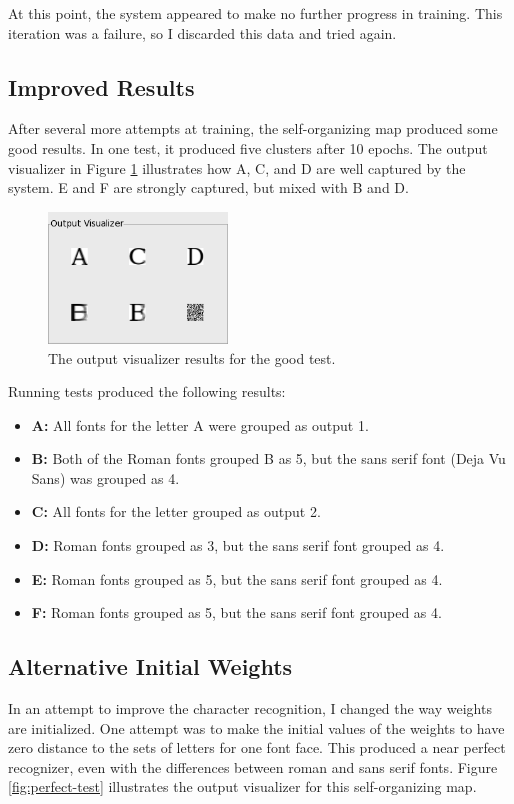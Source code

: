 \documentclass[12pt,letterpaper,oneside]{report}
\begin{document}
At this point, the system appeared to make no further progress in training. This iteration was a failure, so I discarded this data and tried again.

\subsection{Improved Results}
After several more attempts at training, the self-organizing map produced some good results. In one test, it produced five clusters after 10 epochs. The output visualizer in Figure \ref{fig:good-test} illustrates how A, C, and D are well captured by the system. E and F are strongly captured, but mixed with B and D.

\begin{figure}[ht]
  \centering
  \includegraphics[width=180px]{diagrams/good-test.png} 
  \caption{The output visualizer results for the good test.}
  \label{fig:good-test}
\end{figure}

Running tests produced the following results:
\begin{itemize}
    \item\textbf{{A:}} All fonts for the letter A were grouped as output 1.
    \item\textbf{{B:}} Both of the Roman fonts grouped B as 5, but the sans serif font (Deja Vu Sans) was grouped as 4.
    \item\textbf{{C:}} All fonts for the letter grouped as output 2.
    \item\textbf{{D:}} Roman fonts grouped as 3, but the sans serif font grouped as 4.
    \item\textbf{{E:}} Roman fonts grouped as 5, but the sans serif font grouped as 4.
    \item\textbf{{F:}} Roman fonts grouped as 5, but the sans serif font grouped as 4.
\end{itemize}

\subsection{Alternative Initial Weights}
In an attempt to improve the character recognition, I changed the way weights are initialized. One attempt was to make the initial values of the weights to have zero distance to the sets of letters for one font face. This produced a near perfect recognizer, even with the differences between roman and sans serif fonts. Figure \ref{fig:perfect-test} illustrates the output visualizer for this self-organizing map.
\end{document}
